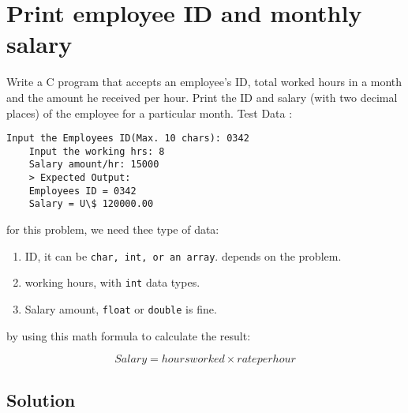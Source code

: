 \documentclass{article}
\begin{document}
  \section{Print employee ID and monthly salary}
  
  Write a C program that accepts an employee's ID, total worked hours in a month and the amount he received per hour. Print the ID and salary (with two decimal places) of the employee for a particular month.
  Test Data :
  
  \begin{lstlisting}[caption=Input, style=plainstyle]
    Input the Employees ID(Max. 10 chars): 0342
    Input the working hrs: 8
    Salary amount/hr: 15000
    > Expected Output:
    Employees ID = 0342
    Salary = U\$ 120000.00 
  \end{lstlisting}
  
  for this problem, we need thee type of data:
  \begin{enumerate}
    \item{ID, it can be \texttt{char, int, or an array}. depends on the problem.} 
    \item{working hours, with \texttt{int} data types.}
    \item{Salary amount, \texttt{float} or \texttt{double} is fine.}
  \end{enumerate}
  by using this math formula to calculate the result:
  
  \begin{equation}
  Salary = hoursworked \times rateperhour
  \label{eq:salary}
  \end{equation}

  \subsection{Solution}
\end{document}
